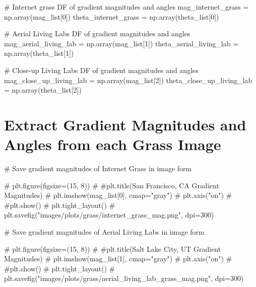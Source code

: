 \documentclass[
  letterpaper,
  DIV=11,
  numbers=noendperiod]{scrreprt}
\newenvironment{Shaded}{\begin{snugshade}}{\end{snugshade}}
\newcommand{\CommentTok}[1]{\textcolor[rgb]{0.37,0.37,0.37}{#1}}
\newcommand{\DecValTok}[1]{\textcolor[rgb]{0.68,0.00,0.00}{#1}}
\newcommand{\NormalTok}[1]{\textcolor[rgb]{0.00,0.23,0.31}{#1}}
\newcommand{\OperatorTok}[1]{\textcolor[rgb]{0.37,0.37,0.37}{#1}}
\begin{document}
\begin{Shaded}
\begin{Highlighting}[]
\CommentTok{\# Internet grass DF of gradient magnitudes and angles}
\NormalTok{mag\_internet\_grass }\OperatorTok{=}\NormalTok{ np.array(mag\_list[}\DecValTok{0}\NormalTok{])}
\NormalTok{theta\_internet\_grass }\OperatorTok{=}\NormalTok{ np.array(theta\_list[}\DecValTok{0}\NormalTok{])}

\CommentTok{\# Aerial Living Labs DF of gradient magnitudes and angles}
\NormalTok{mag\_aerial\_living\_lab }\OperatorTok{=}\NormalTok{ np.array(mag\_list[}\DecValTok{1}\NormalTok{])}
\NormalTok{theta\_aerial\_living\_lab }\OperatorTok{=}\NormalTok{ np.array(theta\_list[}\DecValTok{1}\NormalTok{])}

\CommentTok{\# Close{-}up Living Labs DF of gradient magnitudes and angles}
\NormalTok{mag\_close\_up\_living\_lab }\OperatorTok{=}\NormalTok{ np.array(mag\_list[}\DecValTok{2}\NormalTok{])}
\NormalTok{theta\_close\_up\_living\_lab }\OperatorTok{=}\NormalTok{ np.array(theta\_list[}\DecValTok{2}\NormalTok{])}
\end{Highlighting}
\end{Shaded}

\section{Extract Gradient Magnitudes and Angles from each Grass
Image}\label{extract-gradient-magnitudes-and-angles-from-each-grass-image}

\begin{Shaded}
\begin{Highlighting}[]
\CommentTok{\# Save gradient magnitudes of Internet Grass in image form}

\CommentTok{\# plt.figure(figsize=(15, 8))}
\CommentTok{\# \#plt.title(\textquotesingle{}San Francisco, CA Gradient Magnitudes\textquotesingle{})}
\CommentTok{\# plt.imshow(mag\_list[0], cmap="gray")}
\CommentTok{\# plt.axis("on")}
\CommentTok{\# \#plt.show()}
\CommentTok{\# plt.tight\_layout()}
\CommentTok{\# plt.savefig("images/plots/grass/internet\_grass\_mag.png", dpi=300)}
\end{Highlighting}
\end{Shaded}

\begin{Shaded}
\begin{Highlighting}[]
\CommentTok{\# Save gradient magnitudes of Aerial Living Labs in image form}

\CommentTok{\# plt.figure(figsize=(15, 8))}
\CommentTok{\# \#plt.title(\textquotesingle{}Salt Lake City, UT Gradient Magnitudes\textquotesingle{})}
\CommentTok{\# plt.imshow(mag\_list[1], cmap="gray")}
\CommentTok{\# plt.axis("on")}
\CommentTok{\# \#plt.show()}
\CommentTok{\# plt.tight\_layout()}
\CommentTok{\# plt.savefig("images/plots/grass/aerial\_living\_lab\_grass\_mag.png", dpi=300)}
\end{Highlighting}
\end{Shaded}
\end{document}
